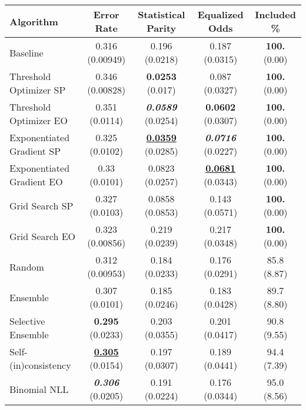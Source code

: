 \begin{tabular} {|l|c|c|c|c|}
\hline
\textbf{Algorithm} & \textbf{Error Rate} & \textbf{Statistical Parity} & \textbf{Equalized Odds} & \textbf{Included \%} \\ \hline
Baseline & 0.316 (0.00949) & 0.196 (0.0218) & 0.187 (0.0315) & \textbf{100.} (0.00) \\ \hline 
Threshold Optimizer SP & 0.346 (0.00828) & \textbf{0.0253} (0.017) & 0.087 (0.0327) & \textbf{100.} (0.00) \\ \hline 
Threshold Optimizer EO & 0.351 (0.0114) & \textbf{\textit{0.0589}} (0.0254) & \textbf{0.0602} (0.0307) & \textbf{100.} (0.00) \\ \hline 
Exponentiated Gradient SP & 0.325 (0.0102) & \textbf{\underline{0.0359}} (0.0285) & \textbf{\textit{0.0716}} (0.0227) & \textbf{100.} (0.00) \\ \hline 
Exponentiated Gradient EO & 0.33 (0.0101) & 0.0823 (0.0257) & \textbf{\underline{0.0681}} (0.0343) & \textbf{100.} (0.00) \\ \hline 
Grid Search SP & 0.327 (0.0103) & 0.0858 (0.0853) & 0.143 (0.0571) & \textbf{100.} (0.00) \\ \hline 
Grid Search EO & 0.323 (0.00856) & 0.219 (0.0239) & 0.217 (0.0348) & \textbf{100.} (0.00) \\ \hline 
Random & 0.312 (0.00953) & 0.184 (0.0233) & 0.176 (0.0291) & 85.8 (8.87) \\ \hline 
Ensemble & 0.307 (0.0101) & 0.185 (0.0246) & 0.183 (0.0428) & 89.7 (8.80) \\ \hline 
Selective Ensemble & \textbf{0.295} (0.0233) & 0.203 (0.0355) & 0.201 (0.0417) & 90.8 (9.55) \\ \hline 
Self-(in)consistency & \textbf{\underline{0.305}} (0.0154) & 0.197 (0.0307) & 0.189 (0.0441) & 94.4 (7.39) \\ \hline 
Binomial NLL & \textbf{\textit{0.306}} (0.0205) & 0.191 (0.0224) & 0.176 (0.0344) & 95.0 (8.56) \\ \hline 
\end{tabular}